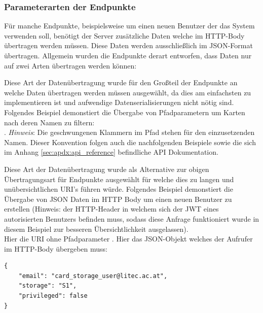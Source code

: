 \subsubsection{Parameterarten der Endpunkte}
Für manche Endpunkte, beispielsweise um einen neuen Benutzer der das System verwenden soll, benötigt der Server zusätzliche Daten welche im HTTP-Body übertragen werden müssen. Diese Daten werden ausschließlich im JSON-Format übertragen. Allgemein wurden die Endpunkte derart entworfen, dass Daten nur auf zwei Arten übertragen werden können:
\begin{description}\setlength\itemsep{1.5em}
\item[Als Teil des Pfades] Diese Art der Datenübertragung wurde für den Großteil der Endpunkte an welche Daten übertragen werden müssen ausgewählt, da dies am einfachsten zu implementieren ist und aufwendige Datenserialisierungen nicht nötig sind. Folgendes Beispiel demonstiert die Übergabe von Pfadparametern um Karten nach deren Namen zu filtern:\\ . \textit{Hinweis}: Die geschwungenen Klammern im Pfad stehen für den einzusetzenden Namen. Dieser Konvention folgen auch die nachfolgenden Beispiele sowie die sich im Anhang \ref{sec:apdx:api_reference} befindliche API Dokumentation. 
\item[Im HTTP Body] Diese Art der Datenübertragung wurde als Alternative zur obigen Übertragungsart für Endpunkte ausgewählt für welche dies zu langen und unübersichtlichen URI's führen würde. Folgendes Beispiel demonstiert die Übergabe von JSON Daten im HTTP Body um einen neuen Benutzer zu erstellen (Hinweis: der HTTP-Header in welchem sich der JWT eines autorisierten Benutzers befinden muss, sodass diese Anfrage funktioniert wurde in diesem Beispiel zur besseren Übersichtlichkeit ausgelassen).\\ Hier die URI ohne Pfadparameter . Hier das JSON-Objekt welches der Aufrufer im HTTP-Body übergeben muss: 
\begin{lstlisting}[style=goMono,caption={Daten werden unter anderem im HTTP-Body übertragen}]
{
    "email": "card_storage_user@litec.ac.at",
    "storage": "S1",
    "privileged": false
}
\end{lstlisting}
\end{description}

